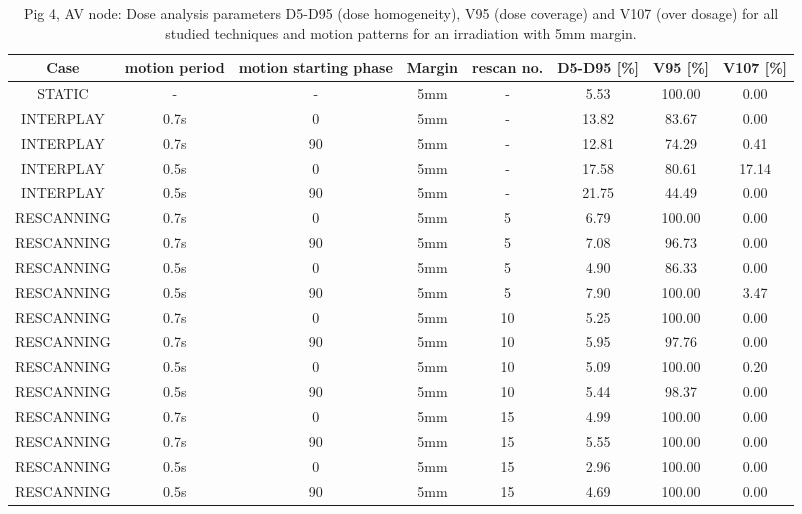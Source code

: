 \begin{table}[H]
  \centering
  \tiny
  \caption{Pig 4, AV node: Dose analysis parameters D5-D95 (dose homogeneity), V95 (dose coverage) and V107 (over dosage) for all studied 
  techniques and motion patterns for an irradiation with 5mm margin.}
  \begin{tabular}{|c||c|c|c|c||c|c|c|}
    \hline\hline
    Case & motion period & motion starting phase & Margin & rescan no. & D5-D95 [\%] & V95 [\%] & V107 [\%] \\
    \hline \hline
STATIC & - & - & 5mm & - & 5.53 & 100.00 & 0.00\\
\hline \hline
INTERPLAY & 0.7s & 0 & 5mm & - & 13.82 & 83.67 & 0.00\\
INTERPLAY & 0.7s & 90 & 5mm & - & 12.81 & 74.29 & 0.41\\
INTERPLAY & 0.5s & 0 & 5mm & - & 17.58 & 80.61 & 17.14\\
INTERPLAY & 0.5s & 90 & 5mm & - & 21.75 & 44.49 & 0.00\\
\hline \hline
RESCANNING & 0.7s & 0 & 5mm & 5 & 6.79 & 100.00 & 0.00\\
RESCANNING & 0.7s & 90 & 5mm & 5 & 7.08 & 96.73 & 0.00\\
RESCANNING & 0.5s & 0 & 5mm & 5 & 4.90 & 86.33 & 0.00\\
RESCANNING & 0.5s & 90 & 5mm & 5 & 7.90 & 100.00 & 3.47\\
\hline
RESCANNING & 0.7s & 0 & 5mm & 10 & 5.25 & 100.00 & 0.00\\
RESCANNING & 0.7s & 90 & 5mm & 10 & 5.95 & 97.76 & 0.00\\
RESCANNING & 0.5s & 0 & 5mm & 10 & 5.09 & 100.00 & 0.20\\
RESCANNING & 0.5s & 90 & 5mm & 10 & 5.44 & 98.37 & 0.00\\
\hline
RESCANNING & 0.7s & 0 & 5mm & 15 & 4.99 & 100.00 & 0.00\\
RESCANNING & 0.7s & 90 & 5mm & 15 & 5.55 & 100.00 & 0.00\\
RESCANNING & 0.5s & 0 & 5mm & 15 & 2.96 & 100.00 & 0.00\\
RESCANNING & 0.5s & 90 & 5mm & 15 & 4.69 & 100.00 & 0.00\\
    \hline\hline 
  \end{tabular}
  \label{tab:Pig4_AV}
\end{table}
